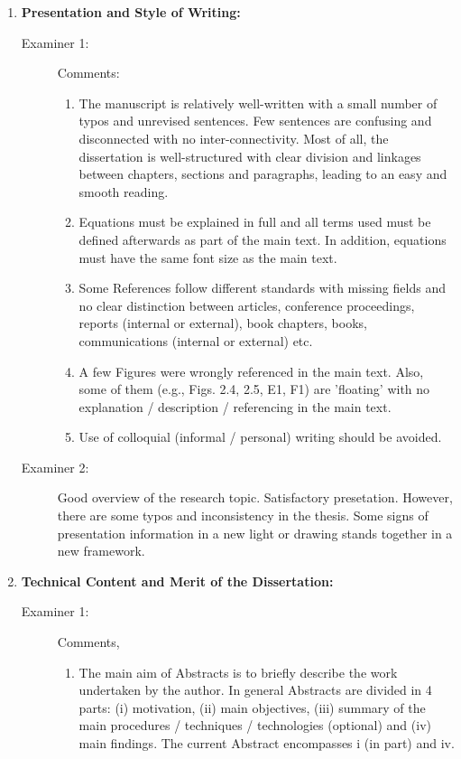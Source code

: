 \documentclass[14pt,twoside]{report}
\begin{document}
\begin{enumerate}
%
    \item {\bf Presentation and Style of Writing:}
        \begin{description}
            \item[Examiner 1:] Comments:
                \begin{enumerate}
                   \item The manuscript is relatively well-written with a small number of typos and unrevised sentences. Few sentences are confusing and disconnected with no inter-connectivity. Most of all, the dissertation is well-structured with clear division and linkages between chapters, sections and paragraphs, leading to an easy and smooth reading.
                   \item Equations must be explained in full and all terms used must be defined afterwards as part of the main text. In addition, equations must have the same font size as the main text.
                   \item Some References follow different standards with missing fields and no clear distinction between articles, conference proceedings, reports (internal or external), book chapters, books, communications (internal or external) etc.
                   \item A few Figures were wrongly referenced in the main text. Also, some of them (e.g., Figs. 2.4, 2.5, E1, F1) are 'floating' with no explanation / description / referencing in the main text.
                   \item Use of  colloquial (informal / personal) writing should be avoided. 
                \end{enumerate}
            \item[Examiner 2:] Good overview of the research topic. Satisfactory presetation. However, there are some typos and inconsistency in the thesis. Some signs of presentation information in a new light or drawing stands together in a new framework.
        \end{description}
%
    \item {\bf Technical Content and Merit of the Dissertation:}
        \begin{description}
            \item[Examiner 1:] Comments,
                \begin{enumerate}
                   \item The main aim of Abstracts is to briefly describe the work undertaken by the author. In general Abstracts are divided in 4 parts: (i) motivation, (ii) main objectives, (iii) summary of the main procedures / techniques / technologies (optional) and (iv) main findings. The current Abstract encompasses i (in part) and iv.

\end{enumerate}
\end{description}
\end{enumerate}
\end{document}
